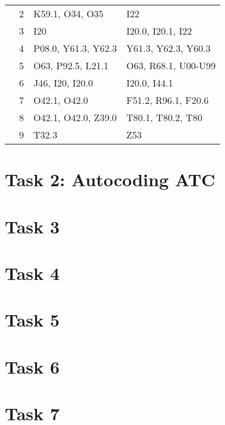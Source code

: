 \begin{table}[htbp]
\begin{tabular}{c c l l}
	 & 2 & K59.1, O34, O35 & I22 \\
	 & 3 & I20 & I20.0, I20.1, I22 \\
	 & 4 & P08.0, Y61.3, Y62.3 & Y61.3, Y62.3, Y60.3 \\
	 & 5 & O63, P92.5, L21.1 & O63, R68.1, U00-U99 \\
	 & 6 & J46, I20, I20.0 & I20.0, I44.1 \\
	 & 7 & O42.1, O42.0 & F51.2, R96.1, F20.6 \\
	 & 8 & O42.1, O42.0, Z39.0 & T80.1, T80.2, T80 \\
	 & 9 & T32.3 & Z53 \\
	\bottomrule
\end{tabular}
\end{table}


\section{Task 2: Autocoding ATC}


\section{Task 3}


\section{Task 4}


\section{Task 5}


\section{Task 6}


\section{Task 7}


